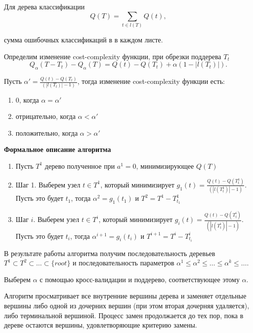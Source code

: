 \documentclass[14pt, a4paper]{article}
\begin{document}
Для дерева классификации
\begin{equation}
Q(T) = \sum_{t \in l(T)} Q(t),
\end{equation}

сумма ошибочных классификаций в в каждом листе.

Определим изменение cost-complexity функции, при обрезки поддерева $T_t$
\begin{equation}
Q_{\alpha}(T - T_t) - Q_{\alpha}(T) = Q(t) - Q(T_t) + \alpha (1 - |l(T_t)|).
\end{equation}

Пусть $\alpha' = \frac{Q(t) - Q(T_t)}{(|l(T_t)| - 1)}$, тогда изменение cost-complexity функции есть:
\begin{enumerate}
\item 0, когда $\alpha = \alpha'$
\item отрицательно, когда $\alpha < \alpha'$
\item положительно, когда $\alpha > \alpha'$
\end{enumerate}

\textbf{Формальное описание алгоритма}
\begin{enumerate}
\item Пусть $T^1$ дерево полученное при $a^1 = 0$, минимизирующее $Q(T)$
\item Шаг 1. Выберем узел $t \in T^1$, который минимизирует $g_1(t) = \frac{Q(t) - Q(T^1_t)}{(|l(T^1_t)| - 1)}$. Пусть это будет $t_1$,  тогда $\alpha^2 = g_1(t_1)$ и $T^2 = T^1 - T^1_{t_1}$
\item Шаг $i$. Выберем узел $t \in T^i$, который минимизирует $g_i(t) = \frac{Q(t) - Q(T^i_t)}{(|l(T^i_t)| - 1)}$. Пусть это будет $t_i$,  тогда $\alpha^{i+1} = g_i(t_i)$ и $T^{i+1} = T^i - T^i_{t_i}$
\end{enumerate}

В результате работы алгоритма получим последовательность деревьев $T^1 \subset T^2 \subset \ldots \subset \{ root\}$ и последовательность параметров $\alpha^1 \le \alpha^2 \le \ldots \le \alpha^k \le \ldots$.

Выберем $\alpha$ с помощью кросс-валидации и поддерево, соответствующее этому $\alpha$.

Алгоритм просматривает все внутренние вершины дерева и заменяет отдельные вершины либо одной из дочерних вершин (при этом вторая дочерняя удаляется), либо терминальной вершиной. Процесс замен продолжается до тех пор, пока в дереве остаются вершины, удовлетворяющие критерию замены.
\end{document}
